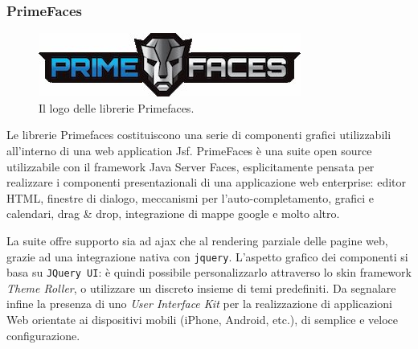 \documentclass{article}
\begin{document}
\subsubsection*{PrimeFaces}
\begin{figure}[h!]
\centering
\includegraphics[width=.5\textwidth]{img/prime}
\caption{Il logo delle librerie Primefaces.}
\end{figure}
Le librerie Primefaces costituiscono una serie di componenti grafici utilizzabili all'interno di una web application Jsf.
PrimeFaces è una suite open source utilizzabile con il framework Java Server Faces, esplicitamente pensata per realizzare i componenti presentazionali di una applicazione web enterprise: editor HTML, finestre di dialogo, meccanismi per l'auto-completamento, grafici e calendari, drag \& drop, integrazione di mappe google e molto altro.
\par La suite offre supporto sia ad ajax che al rendering parziale delle pagine web, grazie ad una integrazione nativa con {\tt jquery}. L'aspetto grafico dei componenti si basa su {\tt JQuery UI}: è quindi possibile personalizzarlo attraverso lo skin framework \emph{Theme Roller}, o utilizzare un discreto insieme di temi predefiniti. Da segnalare infine la presenza di uno \emph{User Interface Kit} per la realizzazione di applicazioni Web orientate ai dispositivi mobili (iPhone, Android, etc.), di semplice e veloce configurazione.
\end{document}
